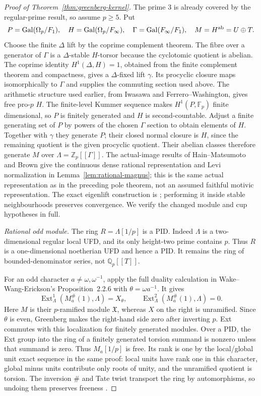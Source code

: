 \documentclass[11pt,a4paper]{article}
\theoremstyle{definition}
\begin{document}
\begin{proof}[Proof of Theorem~\ref{thm:greenberg-kernel}]
The prime $3$ is already covered by the regular-prime result, so
assume $p\ge5$. Put
\[
 P=\operatorname{Gal}(\Omega_p/F_1),\quad
 H=\operatorname{Gal}(\Omega_p/F_\infty),\quad
 \Gamma=\operatorname{Gal}(F_\infty/F_1),\quad
 M=H^{\rm ab}=U\oplus T.
\]
Choose the finite $\Delta$ lift by the coprime complement theorem.
The fibre over a generator of $\Gamma$ is a $\Delta$-stable
$H$-torsor because the cyclotomic quotient is abelian.
The coprime identity $H^1(\Delta,H)=1$, obtained from the finite
complement theorem and compactness, gives a $\Delta$-fixed lift
$\gamma$. Its procyclic closure maps isomorphically to $\Gamma$
and supplies the commuting section used above.
The arithmetic structure used earlier, from Iwasawa and
Ferrero--Washington, gives free pro-$p$ $H$.
The finite-level Kummer sequence makes $H^1(P,\mathbb F_p)$
finite dimensional, so $P$ is finitely generated and $H$ is
second-countable. Adjust a finite generating set of $P$ by powers
of the chosen $\Gamma$ section to obtain elements of $H$.
Together with $\gamma$ they generate $P$; their closed normal
closure is $H$, since the remaining quotient is the given
procyclic quotient. Their abelian classes therefore generate $M$
over $\Lambda=\mathbb Z_p[[\Gamma]]$.
The actual-image results of Hain--Matsumoto and Brown give the
continuous dense rational representation and Levi normalization in
Lemma~\ref{lem:rational-magnus}; this is the same actual
representation as in the preceding pole theorem, not an assumed
faithful motivic representation. The exact eigenlift construction
is \cite[Lemma~2.1, pp.~3--4]{Sharifi2002}; performing it inside
stable neighbourhoods preserves convergence. We verify the changed
module and cup hypotheses in full.

\emph{Rational odd module.}
The ring $R=\Lambda[1/p]$ is a PID. Indeed $\Lambda$ is a
two-dimensional regular local UFD, and its only height-two prime
contains $p$. Thus $R$ is a one-dimensional noetherian UFD and
hence a PID. It remains the ring of bounded-denominator series,
not $\mathbb Q_p[[T]]$.

For an odd character $a\ne\omega,\omega^{-1}$, apply the full
duality calculation in Wake--Wang-Erickson's Proposition~2.2.6
with $\theta=\omega a^{-1}$. It gives
\[
 \operatorname{Ext}^1_\Lambda(M_a^{\#}(1),\Lambda)=X_\theta,
 \qquad
 \operatorname{Ext}^2_\Lambda(M_a^{\#}(1),\Lambda)=0.           \tag{GM.7}
\]
Here $M$ is their $p$-ramified module $\mathfrak X$, whereas $X$
on the right is unramified. Since $\theta$ is even, Greenberg
makes the right-hand side zero after inverting $p$. Ext commutes
with this localization for finitely generated modules. Over a PID,
the Ext group into the ring of a finitely generated torsion summand
is nonzero unless that summand is zero. Thus $M_a[1/p]$ is free.
Its rank is one by the local/global unit exact sequence in the
same proof: local units have rank one in this character, global
minus units contribute only roots of unity, and the unramified
quotient is torsion. The inversion $\#$ and Tate twist transport
the ring by automorphisms, so undoing them preserves freeness
\cite[Proposition~2.2.6 and proof, pp.~3--4]{WakeWangErickson2017}.


\end{proof}
\end{document}

